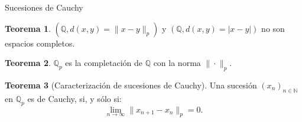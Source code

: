 \documentclass{beamer}
\theoremstyle{definition}
\numberwithin{equation}{section}
\newcommand{\orangee}[1]{\textcolor{thColor}{#1}}
\newtheorem{thh}{\orangee{Teorema}}
\newcommand{\N}{\mathbb{N}}
\newcommand{\Q}{\mathbb{Q}}
\newcommand{\Qp}{\mathbb{Q}_p}
\newcommand{\pnorm}[1]{\|#1\|_p}
\begin{document}
\begin{frame}{Sucesiones de Cauchy}

\begin{thh}
	$ (\Q, d (x,y)=\pnorm{x-y})$ y $ (\Q, d (x,y)=|x-y|)$ no son espacios completos.
\end{thh}
\begin{thh}
	$\Qp$ es la completación de $\Q$ con la norma $\pnorm{\cdot}$.
\end{thh}
\begin{thh}
	[Caracterización de sucesiones de Cauchy]\label{car}
	Una sucesión $ (x_n)_{n\in\N}$ en $\Qp$ es de Cauchy, si, y sólo si:
	\begin{equation}\label{car_cau}
	\lim_{n\to\infty}\pnorm{x_{n+1}-x_n}=0.
	\end{equation}
\end{thh}
\end{frame}
\end{document}

